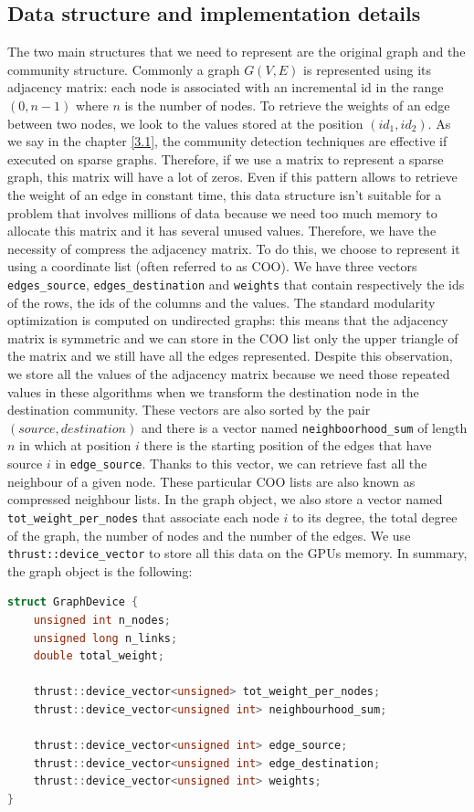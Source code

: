 \subsection{Data structure and implementation details}\label{impl-details}
The two main structures that we need to represent are the original graph and the community structure. Commonly a graph $G(V, E)$ is represented using its adjacency matrix: each node is associated with an incremental id in the range $(0, n-1)$ where $n$ is the number of nodes. To retrieve the weights of an edge between two nodes, we look to the values stored at the position $(id_1, id_2)$. As we say in the chapter \ref{3.1}, the community detection techniques are effective if executed on sparse graphs.  Therefore, if we use a matrix to represent a sparse graph, this matrix will have a lot of zeros. Even if this pattern allows to retrieve the weight of an edge in constant time, this data structure isn't suitable for a problem that involves millions of data because we need too much memory to allocate this matrix and it has several unused values. Therefore, we have the necessity of compress the adjacency matrix. To do this, we choose to represent it using a coordinate list (often referred to as COO). We have three vectors \verb|edges_source|,  \verb|edges_destination| and  \verb|weights| that contain respectively the ids of the rows, the ids of the columns and the values. The standard modularity optimization is computed on undirected graphs: this means that the adjacency matrix is symmetric and we can store in the COO list only the upper triangle of the matrix and we still have all the edges represented. Despite this observation, we store all the values of the adjacency matrix because we need those repeated values in these algorithms when we transform the destination node in the destination community. These vectors are also sorted by the pair $(source, destination)$ and there is a vector named  \verb|neighboorhood_sum| of length $n$ in which at position $i$ there is the starting position of the edges that have source $i$ in \verb|edge_source|. Thanks to this vector, we can retrieve fast all the neighbour of a given node. These particular COO lists are also known as compressed neighbour lists. In the graph object, we also store a vector named \verb| tot_weight_per_nodes| that associate each node $i$ to its degree, the total degree of the graph, the number of nodes and the number of the edges. We use \verb|thrust::device_vector| to store all this data on the GPUs memory. In summary, the graph object is the following:
\begin{lstlisting}[language=C++]
struct GraphDevice {
	unsigned int n_nodes;
	unsigned long n_links;
	double total_weight;

	thrust::device_vector<unsigned> tot_weight_per_nodes;
	thrust::device_vector<unsigned int> neighbourhood_sum;

	thrust::device_vector<unsigned int> edge_source;
	thrust::device_vector<unsigned int> edge_destination;
	thrust::device_vector<unsigned int> weights;
}
\end{lstlisting}
